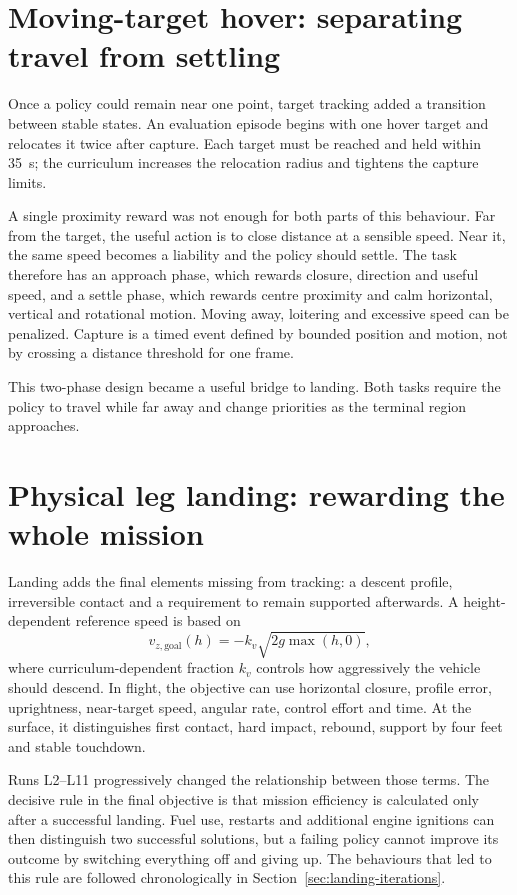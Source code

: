 \section{Moving-target hover: separating travel from settling}

Once a policy could remain near one point, target tracking added a transition between stable
states. An evaluation episode begins with one hover target and relocates it twice after capture.
Each target must be reached and held within \SI{35}{s}; the curriculum increases the relocation
radius and tightens the capture limits.

A single proximity reward was not enough for both parts of this behaviour. Far from the target,
the useful action is to close distance at a sensible speed. Near it, the same speed becomes a
liability and the policy should settle. The task therefore has an approach phase, which rewards
closure, direction and useful speed, and a settle phase, which rewards centre proximity and calm
horizontal, vertical and rotational motion. Moving away, loitering and excessive speed can be
penalized. Capture is a timed event defined by bounded position and motion, not by crossing a
distance threshold for one frame.

This two-phase design became a useful bridge to landing. Both tasks require the policy to travel
while far away and change priorities as the terminal region approaches.

\section{Physical leg landing: rewarding the whole mission}

Landing adds the final elements missing from tracking: a descent profile, irreversible contact
and a requirement to remain supported afterwards. A height-dependent reference speed is based on
\begin{equation}
  v_{z,\mathrm{goal}}(h)=-k_v\sqrt{2g\max(h,0)},
  \label{eq:descent-profile}
\end{equation}
where curriculum-dependent fraction $k_v$ controls how aggressively the vehicle should descend.
In flight, the objective can use horizontal closure, profile error, uprightness, near-target
speed, angular rate, control effort and time. At the surface, it distinguishes first contact,
hard impact, rebound, support by four feet and stable touchdown.

Runs L2--L11 progressively changed the relationship between those terms. The decisive rule in
the final objective is that mission efficiency is calculated only after a successful landing.
Fuel use, restarts and additional engine ignitions can then distinguish two successful solutions,
but a failing policy cannot improve its outcome by switching everything off and giving up. The
behaviours that led to this rule are followed chronologically in
Section~\ref{sec:landing-iterations}.

